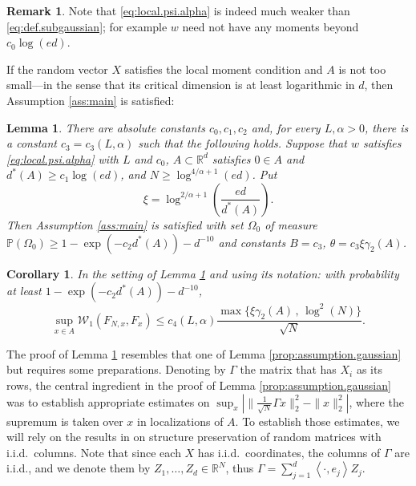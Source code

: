 \documentclass[11pt]{amsart}
\newcommand{\R}{\mathbb{R}}
\newcommand{\inr}[1]{\left\langle #1 \right\rangle}
\newcommand{\W}{\mathcal{W}}
\newtheorem{lemma}[theorem]{Lemma}
\newtheorem{corollary}[theorem]{Corollary}
\theoremstyle{definition}
\newtheorem{remark}[theorem]{Remark}
\renewcommand{\P}{\mathbb{P}}
\numberwithin{equation}{section}
\begin{document}
\begin{remark}
	Note that  \eqref{eq:local.psi.alpha} is indeed much weaker than \eqref{eq:def.subgaussian}; for example $w$ need not  have any moments beyond $c_{0}\log(ed)$.
\end{remark}
 
If the random vector $X$ satisfies the local moment condition and $A$ is not too small---in the sense that its critical dimension is at least logarithmic in $d$, then Assumption \ref{ass:main} is satisfied:

\begin{lemma}
\label{prop:assumption.non.gaussian}
	There are absolute constants $c_{0}, c_{1},c_{2}$ and, for every $L,\alpha >0$, there is a constant $c_{3}=c_{3}(L,\alpha)$ such that the following holds.
	Suppose that $w$ satisfies \eqref{eq:local.psi.alpha} with $L$ and $c_{0}$,  $A\subset \R^d$ satisfies $0\in A$ and   $d^{\ast}(A)\geq c_{1}\log(ed)$, and $N\geq \log^{4/\alpha+ 1}(ed)$.
	Put
	\[ \xi = \log^{2/\alpha + 1}\left(\frac{ed}{ d^{\ast}(A)}\right).\] 
	Then  Assumption \ref{ass:main} is satisfied with set  $\Omega_{0}$ of measure $\P(\Omega_{0})\geq 1 - \exp(-c_2 d^{\ast}(A))-d^{-10} $ and constants $B=c_{3} $, $\theta = c_3  \xi \gamma_{2}(A) $.

\end{lemma}


\begin{corollary}
\label{prop:assumption.non.gaussian.main.W1}
	In the setting of Lemma \ref{prop:assumption.non.gaussian}  and using its notation: with probability at least $1 - \exp(-c_2 d^{\ast}(A))-d^{-10}$,
	\[ \sup_{x\in A } \W_1(F_{N,x},F_x) 
	\leq c_4(L,\alpha)\frac{ \max\{  \xi \gamma_2(A) \, ,\,  \log^2(N) \} }{\sqrt N}.\]
\end{corollary}





The proof of Lemma \ref{prop:assumption.non.gaussian}  resembles that one of Lemma \ref{prop:assumption.gaussian} but requires some preparations.
Denoting by $\Gamma $ the matrix that has $ X_{i}$ as its rows, the central ingredient in the proof of Lemma \ref{prop:assumption.gaussian} was to establish  appropriate estimates on $\sup_{x }| \|\frac{1}{\sqrt N}\Gamma x\|_{2}^{2} - \|x\|_{2}^{2}|$,  where the supremum is taken over $x$ in localizations of $A$.
To establish those estimates, we will rely on the results in \cite{bartl2022random} on structure preservation of random matrices with i.i.d.\ columns.
Note that since each $X$ has i.i.d.\ coordinates, the columns of $\Gamma $ are i.i.d., and we denote them by $Z_{1},\dots, Z_{d}\in\R^{N}$, thus $\Gamma=\sum_{j=1}^d \inr{\cdot,e_j}Z_j$.
\end{document}
